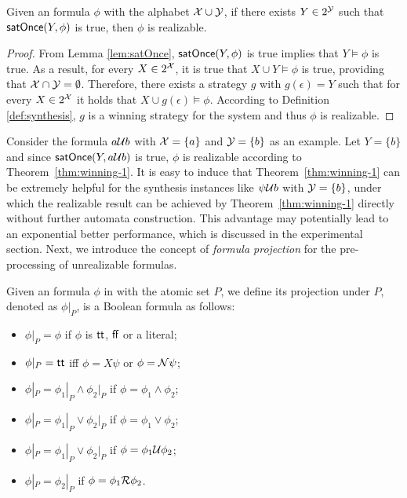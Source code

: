 \begin{theorem}\label{thm:winning-1}
Given an \ltlf formula $\phi$ with the alphabet $\X\cup \Y$, if there exists $Y\in 2^{\Y}$ such that $\satOnce (Y, \phi)$ is true, then $\phi$ is realizable. 
\end{theorem}
\begin{proof}
From Lemma \ref{lem:satOnce}, $\satOnce (Y, \phi)$ is true implies that $Y\models\phi$ is true. As a result, for every $X\in 2^{\X}$, it is true that $X\cup Y\models\phi$ is true, providing that $\X\cap \Y=\emptyset$. Therefore, there exists a strategy $g$ with $g(\epsilon) = Y$ such that for every $X\in 2^{\X}$ it holds that $X\cup g(\epsilon)\models\phi$. According to Definition \ref{def:synthesis}, $g$ is a winning strategy for the system and thus $\phi$ is realizable.
\end{proof}

Consider the formula $a\U b$ with $\X=\{a\}$ and $\Y=\{b\}$ as an example. Let $Y= \{b\}$ and since $\satOnce (Y, a\U b)$ is true, $\phi$ is realizable according to Theorem~\ref{thm:winning-1}. It is easy to induce that Theorem~\ref{thm:winning-1} can be extremely helpful for the synthesis instances like $\psi\U b$ with $\Y=\{b\}$, under which the realizable result can be achieved by Theorem~\ref{thm:winning-1} directly without further automata construction. This advantage may potentially lead to an exponential better performance, which is discussed in the experimental section. Next, we introduce the concept of \emph{formula projection} for the pre-processing of unrealizable formulas. 

\begin{definition}\label{def:fp}
Given an \ltlf formula $\phi$ in \NNF with the atomic set $P$, we define its projection under $P$, denoted as $\phi |_P$, is a Boolean formula as follows:
\begin{itemize}
	\item $\phi|_P = \phi$ if $\phi$ is $\tt$, $\ff$ or a literal;
	\item $\phi|_P = \tt$ iff $\phi = X\psi$ or $\phi = \N\psi$;
	\item $\phi|_P = \phi_1|_P \wedge \phi_2|_P$ if $\phi = \phi_1\wedge\phi_2$;
	\item $\phi|_P = \phi_1|_P \vee \phi_2|_P$ if $\phi = \phi_1\vee\phi_2$;
	\item $\phi|_P = \phi_1|_P \vee \phi_2|_P$ if $\phi = \phi_1\U\phi_2$;
	\item $\phi|_P = \phi_2|_P$ if $\phi = \phi_1\R\phi_2$.
\end{itemize}
\end{definition}

